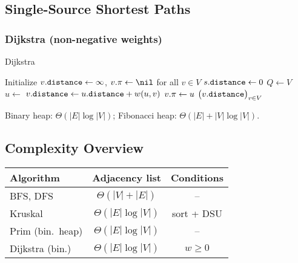 \subsection{Single-Source Shortest Paths}

\subsubsection{Dijkstra (non-negative weights)}

\begin{algorithm}[H]
\caption{Dijkstra}\label{alg:dijkstra}
\begin{algorithmic}[1]
  \State Initialize $v\mathtt{.}\mathtt{distance}\gets\infty$, $\attrib{v}{\pi}\gets\nil$ for all $v\in V$
  \State $s\mathtt{.}\mathtt{distance}\gets 0$
  \State $Q\gets V$  
    \State $u\gets$ 
        \State $v\mathtt{.}\mathtt{distance}\gets u\mathtt{.}\mathtt{distance}+w(u,v)$
        \State $v\mathtt{.}\mathtt{\pi}\gets u$
        \State {}
      \EndIf
    \EndFor
  \EndWhile
  \State \Return $\bigl(v\mathtt{.}\mathtt{distance}\bigr)_{v\in V}$
\EndFunction
\end{algorithmic}
\end{algorithm}

Binary heap: $\Theta(|E|\log|V|)$; Fibonacci heap: $\Theta(|E|+|V|\log|V|)$.

\subsection{Complexity Overview}

\begin{center}\setlength{\tabcolsep}{8pt}
\begin{tabular}{lcc}
\toprule
\textbf{Algorithm} & \textbf{Adjacency list} & \textbf{Conditions} \\\midrule
BFS, DFS           & $\Theta(|V|+|E|)$          & – \\
Kruskal            & $\Theta(|E|\log|V|)$       & sort + DSU \\
Prim (bin.\ heap)  & $\Theta(|E|\log|V|)$       & – \\
Dijkstra (bin.)    & $\Theta(|E|\log|V|)$       & $w\ge 0$ \\
\bottomrule
\end{tabular}
\end{center}
\FloatBarrier






\clearpage

